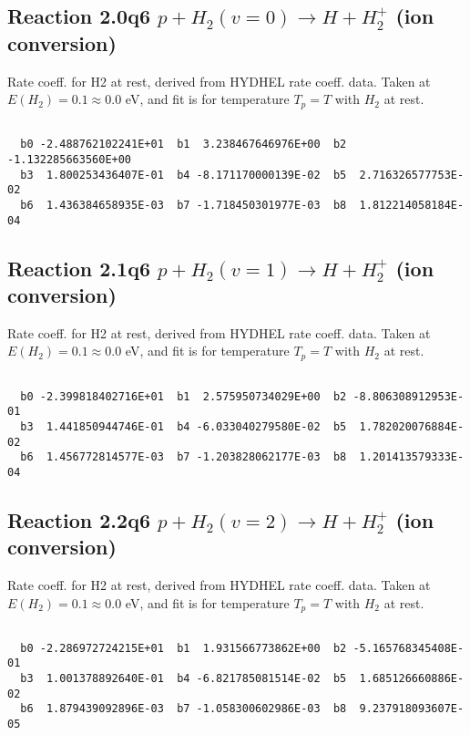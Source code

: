 \subsection{
Reaction 2.0q6
$ p + H_2(v=0) \rightarrow H + H_2^+$ (ion conversion)
}
Rate coeff. for H2 at rest, derived from HYDHEL rate coeff. data.
Taken at $E(H_2) = 0.1 \approx 0.0$ eV,  and fit is for temperature $T_p=T$ with $H_2$ at rest.

\begin{small}\begin{verbatim}

  b0 -2.488762102241E+01  b1  3.238467646976E+00  b2 -1.132285663560E+00
  b3  1.800253436407E-01  b4 -8.171170000139E-02  b5  2.716326577753E-02
  b6  1.436384658935E-03  b7 -1.718450301977E-03  b8  1.812214058184E-04

\end{verbatim}\end{small}

\newpage
\subsection{
Reaction 2.1q6
$ p + H_2(v=1) \rightarrow H + H_2^+$ (ion conversion)
}
Rate coeff. for H2 at rest, derived from HYDHEL rate coeff. data.
Taken at $E(H_2) = 0.1 \approx 0.0$ eV,  and fit is for temperature $T_p=T$ with $H_2$ at rest.

\begin{small}\begin{verbatim}

  b0 -2.399818402716E+01  b1  2.575950734029E+00  b2 -8.806308912953E-01
  b3  1.441850944746E-01  b4 -6.033040279580E-02  b5  1.782020076884E-02
  b6  1.456772814577E-03  b7 -1.203828062177E-03  b8  1.201413579333E-04

\end{verbatim}\end{small}

\newpage
\subsection{
Reaction 2.2q6
$ p + H_2(v=2) \rightarrow H + H_2^+$ (ion conversion)
}
Rate coeff. for H2 at rest, derived from HYDHEL rate coeff. data.
Taken at $E(H_2) = 0.1 \approx 0.0$ eV,  and fit is for temperature $T_p=T$ with $H_2$ at rest.

\begin{small}\begin{verbatim}

  b0 -2.286972724215E+01  b1  1.931566773862E+00  b2 -5.165768345408E-01
  b3  1.001378892640E-01  b4 -6.821785081514E-02  b5  1.685126660886E-02
  b6  1.879439092896E-03  b7 -1.058300602986E-03  b8  9.237918093607E-05

\end{verbatim}\end{small}

